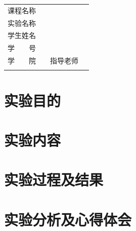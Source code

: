 \documentclass[a4paper, 11pt]{article}
\begin{document}
    \begin{titlepage}

        \begin{center}
        \end{center}

        \begin{table}[!b]
            \fontsize{14pt}{0}\selectfont
            \begin{tabularx}{\textwidth}{lXlX}
                \rule{0pt}{36pt}
                课程名称 & \multicolumn{3}{l}{} \\
                \cline{2-4}
                \rule{0pt}{36pt}
                实验名称 & \multicolumn{3}{l}{} \\
                \cline{2-4}
                \rule{0pt}{36pt}
                学生姓名 & \multicolumn{3}{l}{} \\
                \cline{2-4}
                \rule{0pt}{36pt}
                学　　号 & \multicolumn{3}{l}{} \\
                \cline{2-4}
                \rule{0pt}{36pt}
                学　　院 & {} & \quad 指导老师 & {} \\
                \cline{2-2} \cline{4-4}
                \rule{0pt}{36pt}
            \end{tabularx}
        \end{table}

    \end{titlepage}

    \tableofcontents
    \clearpage

    \section{实验目的}
    \section{实验内容}
    \section{实验过程及结果}
    \section{实验分析及心得体会}
\end{document}
